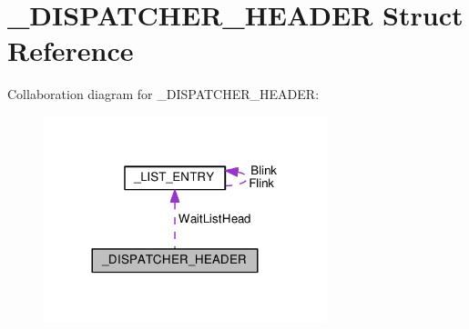 \hypertarget{struct__DISPATCHER__HEADER}{}\section{\+\_\+\+D\+I\+S\+P\+A\+T\+C\+H\+E\+R\+\_\+\+H\+E\+A\+D\+E\+R Struct Reference}
\label{struct__DISPATCHER__HEADER}


Collaboration diagram for \+\_\+\+D\+I\+S\+P\+A\+T\+C\+H\+E\+R\+\_\+\+H\+E\+A\+D\+E\+R\+:
\nopagebreak
\begin{figure}[H]
\begin{center}
\leavevmode
\includegraphics[width=233pt]{struct__DISPATCHER__HEADER__coll__graph}
\end{center}
\end{figure}
